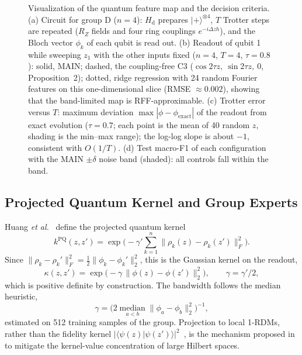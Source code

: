 \documentclass[conference]{IEEEtran}
\begin{document}
\begin{figure}[!t]
    \caption{Visualization of the quantum feature map and the decision criteria. (a) Circuit for group D ($n=4$): $H_{\mathrm{d}}$ prepares $|{+}\rangle^{\otimes4}$, $T$ Trotter steps are repeated ($R_Z$ fields and four ring couplings $e^{-i\Delta z h}$), and the Bloch vector $\phi_k$ of each qubit is read out. (b) Readout of qubit 1 while sweeping $z_1$ with the other inputs fixed ($n{=}4$, $T{=}4$, $\tau{=}0.8$): solid, MAIN; dashed, the coupling-free C3 ($\cos2\tau z,\ \sin2\tau z,\ 0$, Proposition~2); dotted, ridge regression with 24 random Fourier features on this one-dimensional slice (RMSE $\approx0.002$), showing that the band-limited map is RFF-approximable. (c) Trotter error versus $T$: maximum deviation $\max|\phi-\phi_{\mathrm{exact}}|$ of the readout from exact evolution ($\tau{=}0.7$; each point is the mean of 40 random $z$, shading is the min--max range); the log-log slope is about $-1$, consistent with $O(1/T)$. (d) Test macro-F1 of each configuration with the MAIN $\pm\delta$ noise band (shaded): all controls fall within the band.}
    \label{fig:viz-encoding}
\end{figure}

\subsection{Projected Quantum Kernel and Group Experts}
\label{sec:kernel}

Huang \textit{et al.}~\cite{huang2021power} define the projected quantum kernel
\begin{equation}
    k^{\mathrm{PQ}}(z,z')=\exp\!\Big(-\gamma'\sum_{k=1}^{n}\big\|\rho_k(z)-\rho_k(z')\big\|_F^2\Big).
\end{equation}
Since $\|\rho_k-\rho_k'\|_F^2=\tfrac12\|\phi_k-\phi_k'\|_2^2$, this is the Gaussian kernel on the readout,
\begin{equation}
    \kappa(z,z')=\exp\!\big(-\gamma\,\|\phi(z)-\phi(z')\|_2^2\big),\qquad\gamma=\gamma'/2,
    \label{eq:pqk}
\end{equation}
which is positive definite by construction. The bandwidth follows the median heuristic,
\begin{equation}
    \gamma=\Big(2\operatorname*{median}_{a<b}\|\phi_a-\phi_b\|_2^2\Big)^{-1},
    \label{eq:median-gamma}
\end{equation}
estimated on 512 training samples of the group. Projection to local 1-RDMs, rather than the fidelity kernel $|\langle\psi(z)|\psi(z')\rangle|^2$~\cite{havlicek2019}, is the mechanism proposed in~\cite{huang2021power} to mitigate the kernel-value concentration of large Hilbert spaces.
\end{document}
